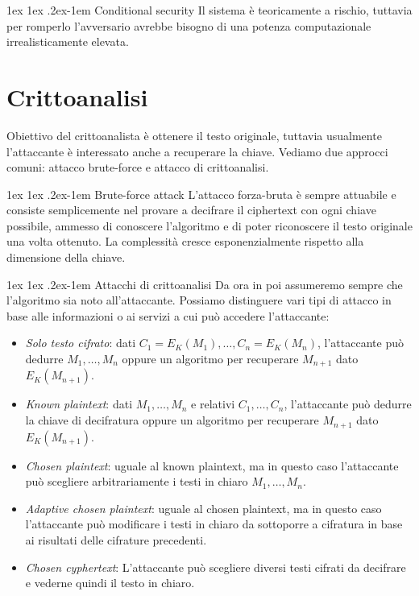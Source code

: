 \documentclass[a4paper, 11pt, twoside, openright, fleqn]{report}
\makeatletter
\renewcommand{\paragraph}{%
	\@startsection{paragraph}{4}%
	{\z@}{1ex \@plus 1ex \@minus .2ex}{-1em}%
	{\normalfont\normalsize\bfseries}%
}
\makeatother
\begin{document}
\paragraph{Conditional security} Il sistema è teoricamente a rischio, tuttavia per romperlo l'avversario avrebbe bisogno di una potenza computazionale irrealisticamente elevata.


\section{Crittoanalisi}
Obiettivo del crittoanalista è ottenere il testo originale, tuttavia usualmente l'attaccante è interessato anche a recuperare la chiave. Vediamo due approcci comuni:
attacco brute-force e attacco di crittoanalisi.

\paragraph{Brute-force attack}
L'attacco forza-bruta è sempre attuabile e consiste semplicemente nel provare a decifrare il ciphertext con ogni chiave possibile, ammesso di conoscere l'algoritmo e di poter riconoscere il testo originale una volta ottenuto. La complessità cresce esponenzialmente rispetto alla dimensione della chiave.

\paragraph{Attacchi di crittoanalisi}
Da ora in poi assumeremo sempre che l'algoritmo sia noto all'attaccante. Possiamo distinguere vari tipi di attacco in base alle informazioni o ai servizi a cui può accedere l'attaccante:
\begin{itemize}
	\item \emph{Solo testo cifrato}: dati $C_1 = E_K(M_1), \dots, C_n = E_K(M_n)$, l'attaccante può dedurre $M_1, \dots, M_n$ oppure un algoritmo per recuperare $M_{n+1}$ dato $E_K(M_{n+1})$.
	\item \emph{Known plaintext}: dati $M_1, \dots, M_n$ e relativi $C_1, \dots, C_n$, l'attaccante può dedurre la chiave di decifratura oppure un algoritmo per recuperare $M_{n+1}$ dato $E_K(M_{n+1})$.
	\item \emph{Chosen plaintext}: uguale al known plaintext, ma in questo caso l'attaccante può scegliere arbitrariamente i testi in chiaro $M_1, \dots, M_n$.
	\item \emph{Adaptive chosen plaintext}: uguale al chosen plaintext, ma in questo caso l'attaccante può modificare i testi in chiaro da sottoporre a cifratura in base ai risultati delle cifrature precedenti.
	\item \emph{Chosen cyphertext}: L'attaccante può scegliere diversi testi cifrati da decifrare e vederne quindi il testo in chiaro.
\end{itemize}
\end{document}
